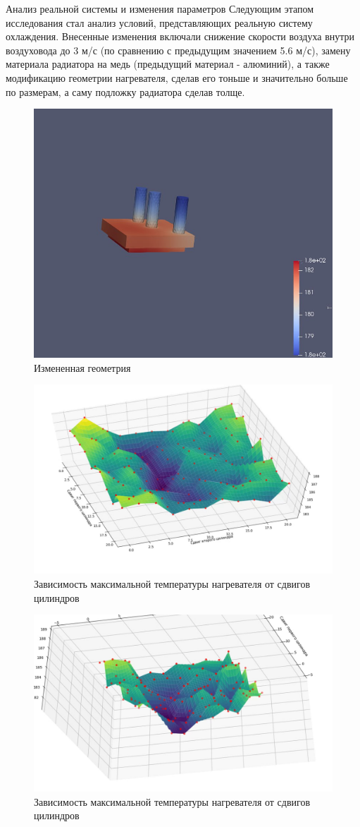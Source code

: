 \documentclass{beamer}
\begin{document}
\begin{frame}{Анализ реальной системы и изменения параметров}
	Следующим этапом исследования стал анализ условий, представляющих реальную систему охлаждения. Внесенные изменения включали снижение скорости воздуха внутри воздуховода до 3 м/с (по сравнению с предыдущим значением 5.6 м/с), замену материала радиатора на медь (предыдущий материал - алюминий), а также модификацию геометрии нагревателя, сделав его тоньше и значительно больше по размерам, а саму подложку радиатора сделав толще.

	\begin{figure}[h]
		\centering
		\includegraphics[width=0.4\linewidth]{23.1.jpg}
		\caption{Измененная геометрия}
	\end{figure}
	\begin{figure}[h]
		\centering
		\includegraphics[width=0.4\linewidth]{23.2.jpg}
		\caption{Зависимость максимальной температуры нагревателя от сдвигов цилиндров}
	\end{figure}
	\begin{figure}[h]
		\centering
		\includegraphics[width=0.4\linewidth]{23.3.jpg}
		\caption{Зависимость максимальной температуры нагревателя от сдвигов цилиндров}
	\end{figure}
\end{frame}
\end{document}
